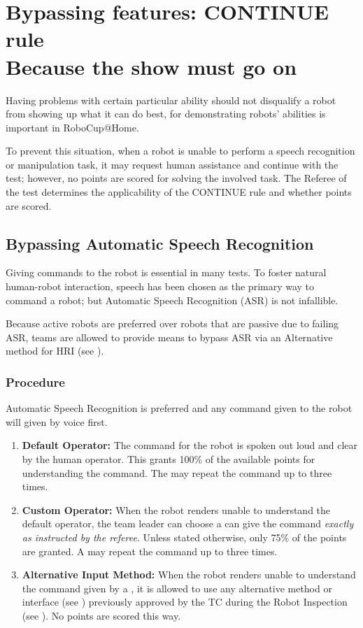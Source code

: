  
\section[CONTINUE rules]{Bypassing features: CONTINUE rule \\ \small Because the show must go on}
\label{rule:continue}
Having problems with certain particular ability should not disqualify a robot from showing up what it can do best, for demonstrating robots' abilities is important in RoboCup@Home.

To prevent this situation, when a robot is unable to perform a
speech recognition
or manipulation
task, it may request human assistance and continue with the test; however, no points are scored for solving the involved task. The Referee of the test determines the applicability of the CONTINUE rule and whether points are scored.

\subsection{Bypassing Automatic Speech Recognition}
\label{rule:asrcontinue}
Giving commands to the robot is essential in many tests. To foster natural human-robot interaction, speech has been chosen as the primary way to command a robot; but Automatic Speech Recognition (ASR) is not infallible.

Because active robots are preferred over robots that are passive due to failing ASR, teams are allowed to provide means to bypass ASR via an Alternative method for HRI (see ).

\subsubsection{Procedure}
Automatic Speech Recognition is preferred and any command given to the robot will given by voice first.
\begin{enumerate}
	\item \textbf{Default Operator:} The command for the robot is spoken out loud and clear by the human operator. This grants 100\% of the available points for understanding the command. The  may repeat the command up to three times.

	\item \textbf{Custom Operator:} When the robot renders unable to understand the default operator, the team leader can choose a  can give the command \emph{exactly as instructed by the referee}. Unless stated otherwise, only 75\% of the points are granted. A  may repeat the command up to three times.

	\item \textbf{Alternative Input Method:} When the robot renders unable to understand the command given by a , it is allowed to use any alternative method or interface (see ) previously approved by the TC during the Robot Inspection (see ). No points are scored this way.
\end{enumerate}


